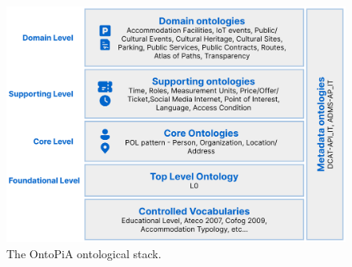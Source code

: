 \begin{figure}[!ht]
  \centering
  \includegraphics[width=0.8\columnwidth]{images/ontopia/ontopia-stack}
  \caption{The OntoPiA ontological stack.}
  \label{fig:ontopia-stack}
\end{figure}

